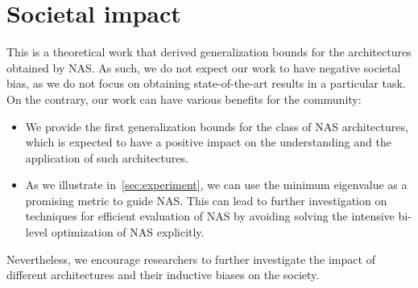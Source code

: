 \documentclass[nohyperref]{article}
\theoremstyle{plain}
\theoremstyle{definition}
\theoremstyle{remark}
\begin{document}
\section{Societal impact}
\label{sec:nas_societal_impact}

This is a theoretical work that derived generalization bounds for the architectures obtained by NAS. As such, we do not expect our work to have negative societal bias, as we do not focus on obtaining state-of-the-art results in a particular task. On the contrary, our work can have various benefits for the community: 
\begin{itemize}
    \item We provide the first generalization bounds for the class of NAS architectures, which is expected to have a positive impact on the understanding and the application of such architectures. 
    \item As we illustrate in~\cref{sec:experiment}, we can use the minimum eigenvalue as a  promising metric to guide NAS. This can lead to further investigation on techniques for efficient evaluation of NAS by avoiding solving the intensive bi-level optimization of NAS explicitly. 
\end{itemize}

Nevertheless, we encourage researchers to further investigate the impact of different architectures and their inductive biases on the society. 
\end{document}
